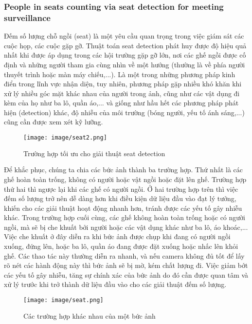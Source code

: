 \documentclass[12pt,a4paper]{article}
\begin{document}
		    \subsubsection{People in seats counting via seat detection for meeting surveillance \cite{Seat Detection}}
Đếm số lượng chỗ ngồi (seat) là một yêu cầu quan trọng trong việc giám sát các cuộc họp, các cuộc gặp gỡ. Thuật toán seat detection phát huy được độ hiệu quả nhất khi được áp dụng trong các hội trường gặp gỡ lớn, nơi các ghế ngồi được cố định và những người tham gia cùng nhìn về một hướng (thường là về phía người thuyết trình hoặc màn máy chiếu,...). Là một trong những phương pháp kinh điển trong lĩnh vực nhận diện, tuy nhiên, phương pháp gặp nhiều khó khăn khi xử lý nhiều góc mặt khác nhau của người trong ảnh, cũng như các vật dụng đi kèm của họ như ba lô, quần áo,... và giống như hầu hết các phương pháp phát hiện (detection) khác, độ nhiễu của môi trường (bóng người, yếu tố ánh sáng,...) cũng cần được xem xét kỹ lưỡng. \\
    \begin{figure}[!ht]
        \centering
        \texttt{[image: image/seat2.png]}
        \caption{Trường hợp tối ưu cho giải thuật seat detection \cite{Seat Detection}}
        \label{fig:my_label}
    \end{figure}

Để khắc phục, chúng ta chia các bức ảnh thành ba trường hợp. Thứ nhất là các ghế hoàn toàn trống, không có người hoặc vật ngồi hoặc đặt lên ghế. Trường hợp thứ hai thì ngược lại khi các ghế có người ngồi. Ở hai trường hợp trên thì việc đếm số lượng trở nên dễ dàng hơn khi điều kiện dữ liệu đầu vào đạt lý tưởng, khiến cho các giải thuật hoạt động nhanh hơn, tránh được các yếu tố gây nhiễu khác. Trong trường hợp cuối cùng, các ghế không hoàn toàn trống hoặc có người ngồi, mà sẽ bị che khuất bởi người hoặc các vật dụng khác như ba lô, áo khoác,... Việc che khuất ở đây diễn ra khi bức ảnh được chụp khi đang có người ngồi xuống, đứng lên, hoặc ba lô, quần áo đang được đặt xuống hoặc nhấc lên khỏi ghế. Các thao tác này thường diễn ra nhanh, và nếu camera không đủ tốt để lấy rõ nét các hành động này thì bức ảnh sẽ bị mờ, kém chất lượng đi. Việc giảm bớt các yếu tố gây nhiễu, tăng sự chính xác của bức ảnh do đó cần được quan tâm và xử lý trước khi trở thành dữ liệu đầu vào cho các giải thuật đếm số lượng.

		        \begin{figure}[H]
		            \centering
		            \texttt{[image: image/seat.png]}
		            \caption{Các trường hợp khác nhau của một bức ảnh \cite{Seat Detection}}
		            \label{fig:my_label}
		        \end{figure}
\end{document}
